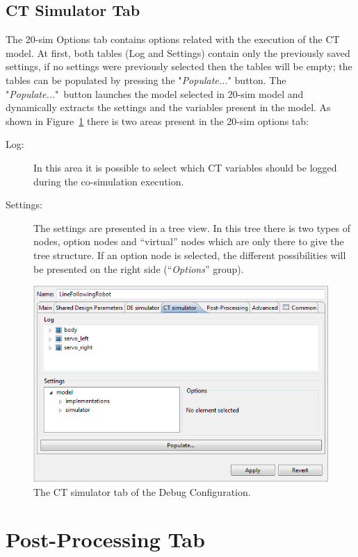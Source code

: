\documentclass{crescendorepchap}
\begin{document}
\subsection{CT Simulator Tab}

The 20-sim Options tab contains options related with the execution of
the CT model. At first, both tables (Log and Settings) contain only the
previously saved settings, if no settings were previously selected then
the tables will be empty; the tables can be populated by pressing the
"\emph{Populate...}" button. The "\emph{Populate..}."~button launches
the model selected in 20-sim model and dynamically extracts the settings
and the variables present in the model. As shown in Figure~\ref{fig:CTSimInDebug} there is two areas present
in the 20-sim options tab:

\begin{description}
\item[Log:] In this area it is possible to select which CT variables
  should be logged during the co-simulation execution.
\item[Settings:] The settings are presented in a tree view. In this tree
  there is two types of nodes, option nodes and ``virtual'' nodes which
  are only there to give the tree structure. If an option node is
  selected, the different possibilities will be presented on the right
  side (``\emph{Options}'' group).
\end{description}


\begin{figure}[htbp]
\centering
\includegraphics[width=.6\textwidth]{images/DestecsDebugConfigurationCTSimulator.png}
\caption{The CT simulator tab of the Debug Configuration.\label{fig:CTSimInDebug}}
\end{figure}


\section{Post-Processing Tab}
\end{document}
